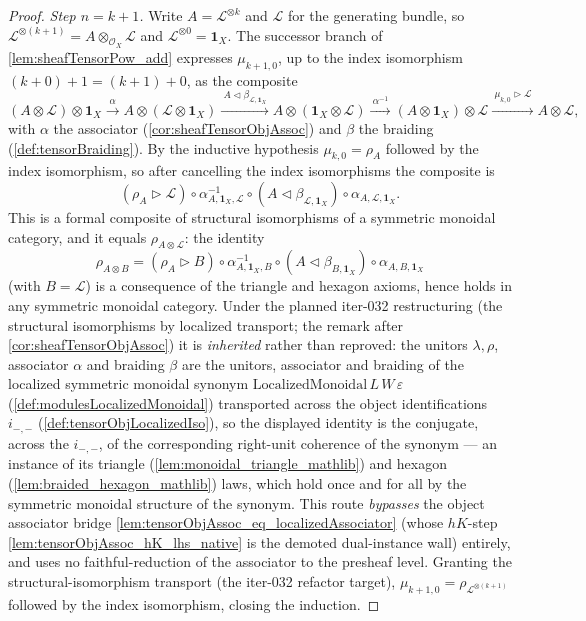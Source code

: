 \begin{proof}
  \emph{Step \(n = k+1\).} Write \(A = \mathcal{L}^{\otimes k}\) and
  \(\mathcal{L}\) for the generating bundle, so
  \(\mathcal{L}^{\otimes (k+1)} = A \otimes_{\mathcal{O}_X} \mathcal{L}\) and
  \(\mathcal{L}^{\otimes 0} = \mathbf{1}_X\). The successor branch of
  \cref{lem:sheafTensorPow_add} expresses \(\mu_{k+1,0}\), up to the index
  isomorphism \((k+0)+1 = (k+1)+0\), as the composite
  \[
    (A \otimes \mathcal{L}) \otimes \mathbf{1}_X
      \xrightarrow{\ \alpha\ }
      A \otimes (\mathcal{L} \otimes \mathbf{1}_X)
      \xrightarrow{\ A \lhd \beta_{\mathcal{L},\mathbf{1}_X}\ }
      A \otimes (\mathbf{1}_X \otimes \mathcal{L})
      \xrightarrow{\ \alpha^{-1}\ }
      (A \otimes \mathbf{1}_X) \otimes \mathcal{L}
      \xrightarrow{\ \mu_{k,0} \rhd \mathcal{L}\ }
      A \otimes \mathcal{L},
  \]
  with \(\alpha\) the associator (\cref{cor:sheafTensorObjAssoc}) and \(\beta\) the
  braiding (\cref{def:tensorBraiding}). By the inductive hypothesis
  \(\mu_{k,0} = \rho_A\) followed by the index isomorphism, so after cancelling
  the index isomorphisms the composite is
  \[
    (\rho_A \rhd \mathcal{L}) \circ \alpha^{-1}_{A,\mathbf{1}_X,\mathcal{L}}
      \circ (A \lhd \beta_{\mathcal{L},\mathbf{1}_X})
      \circ \alpha_{A,\mathcal{L},\mathbf{1}_X}.
  \]
  This is a formal composite of structural isomorphisms of a symmetric monoidal
  category, and it equals \(\rho_{A \otimes \mathcal{L}}\): the identity
  \[
    \rho_{A \otimes B}
      = (\rho_A \rhd B) \circ \alpha^{-1}_{A,\mathbf{1}_X,B}
        \circ (A \lhd \beta_{B,\mathbf{1}_X})
        \circ \alpha_{A,B,\mathbf{1}_X}
  \]
  (with \(B = \mathcal{L}\)) is a consequence of the triangle and hexagon axioms,
  hence holds in any symmetric monoidal category. Under the planned iter-032
  restructuring (the structural isomorphisms by localized transport; the remark
  after \cref{cor:sheafTensorObjAssoc}) it is \emph{inherited} rather than
  reproved: the unitors \(\lambda,\rho\), associator \(\alpha\) and braiding
  \(\beta\) are the unitors, associator and braiding of the localized symmetric
  monoidal synonym \(\mathrm{LocalizedMonoidal}\,L\,W\,\varepsilon\)
  (\cref{def:modulesLocalizedMonoidal}) transported across the object
  identifications \(i_{-,-}\) (\cref{def:tensorObjLocalizedIso}), so the displayed
  identity is the conjugate, across the \(i_{-,-}\), of the corresponding
  right-unit coherence of the synonym --- an instance of its triangle
  (\cref{lem:monoidal_triangle_mathlib}) and hexagon
  (\cref{lem:braided_hexagon_mathlib}) laws, which hold once and for all by the
  symmetric monoidal structure of the synonym. This route \emph{bypasses} the
  object associator bridge \cref{lem:tensorObjAssoc_eq_localizedAssociator} (whose
  \(hK\)-step \cref{lem:tensorObjAssoc_hK_lhs_native} is the demoted dual-instance
  wall) entirely, and uses no faithful-reduction of the associator to the presheaf
  level. Granting the structural-isomorphism transport (the iter-032 refactor
  target), \(\mu_{k+1,0} = \rho_{\mathcal{L}^{\otimes (k+1)}}\) followed by the
  index isomorphism, closing the induction.


\end{proof}
